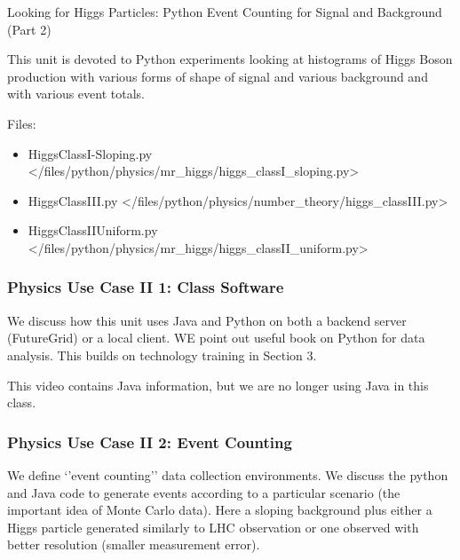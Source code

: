 Looking for Higgs Particles: Python Event Counting for Signal and
Background (Part 2)


This unit is devoted to Python experiments looking at histograms of
Higgs Boson production with various forms of shape of signal and various
background and with various event totals.


Files:

\begin{itemize}

\item
  HiggsClassI-Sloping.py \textless{}/files/python/physics/mr\_higgs/higgs\_classI\_sloping.py\textgreater{}
\item
  HiggsClassIII.py \textless{}/files/python/physics/number\_theory/higgs\_classIII.py\textgreater{}
\item
  HiggsClassIIUniform.py \textless{}/files/python/physics/mr\_higgs/higgs\_classII\_uniform.py\textgreater{}
\end{itemize}

\subsubsection{Physics Use Case II 1: Class
Software}\label{physics-use-case-ii-1-class-software}

We discuss how this unit uses Java and Python on both a backend server
(FutureGrid) or a local client. WE point out useful book on Python for
data analysis. This builds on technology training in Section 3.


\begin{WARNING}
This video contains Java information, but we are no longer using Java in
this class.
\end{WARNING}

\subsubsection{Physics Use Case II 2: Event
Counting}\label{physics-use-case-ii-2-event-counting}

We define `'event counting'' data collection environments. We discuss
the python and Java code to generate events according to a particular
scenario (the important idea of Monte Carlo data). Here a sloping
background plus either a Higgs particle generated similarly to LHC
observation or one observed with better resolution (smaller measurement
error).

